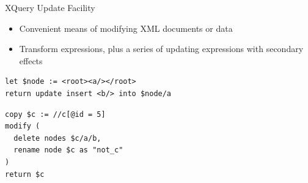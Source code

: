 \documentclass[svgnames]{beamer}
\begin{document}
\begin{frame}[fragile]{XQuery Update Facility}
\begin{itemize}
\item Convenient means of modifying XML documents or data
\item Transform expressions, plus a series of updating expressions with secondary effects
\end{itemize}

\begin{block}{}
\begin{verbatim}
let $node := <root><a/></root>
return update insert <b/> into $node/a
\end{verbatim}
\end{block}

\begin{block}{}
\begin{verbatim}
copy $c := //c[@id = 5]
modify (
  delete nodes $c/a/b,
  rename node $c as "not_c"
)
return $c
\end{verbatim}
\end{block}

\end{frame}


\end{document}
